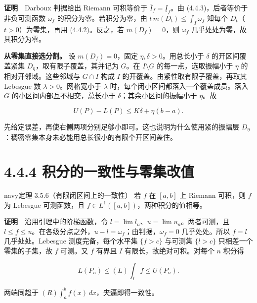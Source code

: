 \documentclass[11pt,a4paper]{article}
\begin{document}
\textbf{证明}　Darboux 判据给出 Riemann 可积等价于
\(\overline I_f=\underline I_f\)。由 (4.4.3)，后者等价于非负可测函数
\(\omega_f\) 的积分为零。若积分为零，由 \(t\,m(D_t)\le\int_I\omega_f\)
知每个 \(D_t\)（\(t>0\)）为零集，再用 (4.4.2)。反之，若 \(m(D_f)=0\)，则
\(\omega_f\) 几乎处处为零，故其积分为零。

\textbf{从零集直接选分割。} 设 \(m(D_f)=0\)，固定
\(\eta,\delta>0\)。用总长小于 \(\delta\) 的开区间覆盖紧集
\(D_\eta\)，取有限子覆盖，其并记为 \(G\)。在 \(I\setminus G\)
的每一点，选取振幅小于 \(\eta\) 的相对开邻域。这些邻域与 \(G\cap I\)
构成 \(I\) 的开覆盖。由紧性取有限子覆盖，再取其 Lebesgue 数
\(\lambda>0\)。网格宽小于 \(\lambda\)
时，每个闭小区间都落入一个覆盖成员。落入 \(G\)
的小区间内部互不相交，总长小于 \(\delta\)；其余小区间的振幅小于
\(\eta\)。故

\begin{equation*}
U(P)-L(P)\le K\delta+\eta(b-a).
\tag{4.4.4}
\end{equation*}

先给定误差，再使右侧两项分别足够小即可。这也说明为什么使用紧的振幅层
\(D_\eta\)：稠密零集本身未必能用总长很小的有限个开区间盖住。

\section[\S{}4.4.4
积分的一致性与零集改值]{4.4.4
积分的一致性与零集改值}\label{ux79efux5206ux7684ux4e00ux81f4ux6027ux4e0eux96f6ux96c6ux6539ux503c}

\begin{sboxenv}{navy}{定理 3.5.6（有限闭区间上的一致性）}
若 \(f\) 在 \([a,b]\) 上 Riemann 可积，则 \(f\) 为 Lebesgue 可测函数，且
\(f\in L^1([a,b])\)，两种积分的值相等。

\end{sboxenv}

\textbf{证明}　沿用引理中的阶梯函数，令
\(l=\lim l_n\)、\(u=\lim u_n\)。两者可测，且
\(l\le f\le u\)。在各级分点之外，\(u-l=\omega_f\)；由判据，\(\omega_f=0\)
几乎处处。所以 \(f=l\) 几乎处处。Lebesgue 测度完备，每个水平集
\(\{f>c\}\) 与可测集 \(\{l>c\}\) 只相差一个零集的子集，故 \(f\) 可测。又
\(f\) 有界且 \(I\) 有限长，故绝对可积。对每个 \(n\) 积分得

\begin{equation*}
L(P_n)\le (L)\int_I f\le U(P_n).
\end{equation*}

两端同趋于 \((R)\int_a^b f(x)\,dx\)，夹逼即得一致性。
\end{document}
